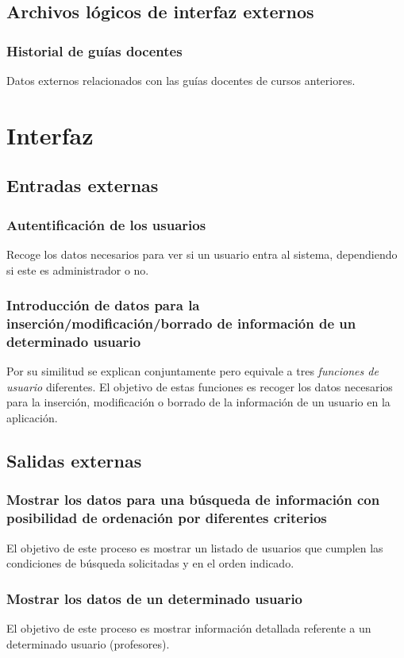 \documentclass[11pt,a4paper,spanish,twoside]{book}
\begin{document}
\subsection{Archivos lógicos de interfaz externos}
\subsubsection{Historial de guías docentes}
Datos externos relacionados con las guías docentes de cursos anteriores. 
 
\section{Interfaz}
\subsection{Entradas externas}
\subsubsection{Autentificación de los usuarios}
Recoge los datos necesarios para ver si un usuario entra al sistema,
dependiendo si este es administrador o no.

\subsubsection{Introducción de datos para la inserción/modificación/borrado 
de información de un determinado usuario}
Por su similitud se explican conjuntamente pero equivale a tres
\emph{funciones de usuario} diferentes. El objetivo de estas funciones es
recoger los datos necesarios para la inserción, modificación o borrado de
la información de un usuario en la aplicación.

\subsection{Salidas externas}
\subsubsection{Mostrar los datos para una búsqueda de información con
  posibilidad de ordenación por diferentes criterios}
El objetivo de este proceso es mostrar un listado de usuarios que cumplen las
condiciones de búsqueda solicitadas y en el orden indicado.

\subsubsection{Mostrar los datos de un determinado usuario}
El objetivo de este proceso es mostrar información detallada referente a un
determinado usuario (profesores).
\end{document}
